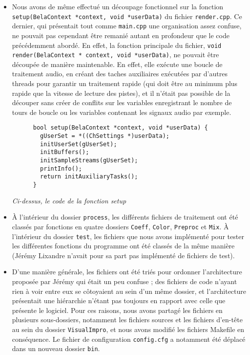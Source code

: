 \begin{itemize}
    \item Nous avons de même effectué un découpage fonctionnel sur la
      fonction \verb!setup(BelaContext *context, void *userData)! du
      fichier \verb!render.cpp!. Ce dernier, qui présentait tout comme
      \verb!main.cpp! une organisation assez confuse, ne pouvait pas
      cependant être remanié autant en profondeur que le code
      précédemment abordé. En effet, la fonction principale du
      fichier,
      \verb!void render(BelaContext * context, void *userData)!, ne
      pouvait être découpée de manière maintenable. En effet, elle
      exécute une boucle de traitement audio, en créant des taches
      auxiliaires exécutées par d'autres threads pour garantir un
      traitement rapide (qui doit être au minimum plus rapide que la
      vitesse de lecture des pistes), et il n'était pas possible de la
      découper sans créer de conflits sur les variables enregistrant
      le nombre de tours de boucle ou les variables contenant les
      signaux audio par exemple.

      \begin{lstlisting}
      bool setup(BelaContext *context, void *userData) {
        gUserSet = *((ChSettings *)userData);
        initUserSet(gUserSet);
        initBuffers();
        initSampleStreams(gUserSet);
        printInfo();
        return initAuxiliaryTasks();
      }
    \end{lstlisting}

    \begin{center}
      \textit{Ci-dessus, le code de la fonction setup}
    \end{center}    

      \item \`{A} l'intérieur du dossier \verb!process!, les
        différents fichiers de traitement ont été classés par
        fonctions en quatre dossiers \verb!Coeff!, \verb!Color!,
        \verb!Preproc! et \verb!Mix!. \`{A} l'intérieur du dossier
        \verb!test!, les fichiers que nous avons implémenté pour tester les
        différentes fonctions du programme ont été classés de la même
        manière (Jérémy Lixandre n'avait pour sa part pas implémenté
        de fichiers de test).

        \item D'une manière générale, les fichiers ont été triés pour
          ordonner l'architecture proposée par Jérémy qui était un peu
          confuse ; des fichiers de code n'ayant rien à voir entre eux
          se côtoyaient au sein d'un même dossier, et l'architecture
          présentait une hiérarchie n'étant pas toujours en rapport
          avec celle que présente le logiciel. Pour ces raisons, nous
          avons partagé les fichiers en plusieurs sous-dossiers,
          notamment les fichiers sources et les fichiers d'en-tête au
          sein du dossier \verb!VisualImpro!, et nous avons modifié
          les fichiers Makefile en conséquence. Le fichier de
          configuration \verb!config.cfg! a notamment été déplacé dans
          un nouveau dossier \verb!bin!.


\end{itemize}
